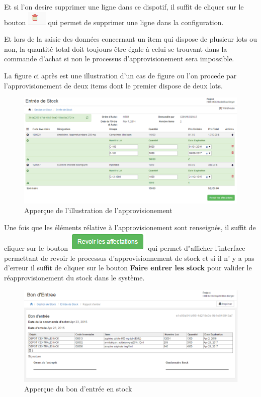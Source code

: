 \documentclass[12pt,a4paper]{report}
\begin{document}
Et si l'on desire supprimer une ligne dans ce dispotif, il suffit de cliquer sur le bouton \includegraphics[scale=0.7]{pic/DeleteWRed.png} qui permet de supprimer une ligne dans la configuration.

Et lors de la saisie des données concernant un item qui dispose de plusieur lots ou non, la quantité total doit toujours être égale à celui se trouvant dans la commande d'achat si non le processus d'approvisionement sera impossible.

La figure ci après est une illustration d'un cas de figure ou l'on procede par l'approvisionement de deux items dont le premier dispose de deux lots.

\begin{figure}[h]
\begin{center}
\includegraphics[width=12cm]{pic/AppStockOK.png}
\end{center}
\caption{Apperçue de l'illustration de l'approvisionement}
\label{Apperçue de l'illustration de l'approvisionement}
\end{figure}

Une fois que les éléments rélative à l'approvisionement sont renseignés, il suffit de cliquer sur le bouton \includegraphics[scale=0.7]{pic/RevAffectation.png} qui permet d"afficher l'interface permettant de revoir le processus d'approvisionnement de stock et si il n' y a pas d'erreur il suffit de cliquer sur le bouton \textbf{Faire entrer les stock} pour valider le réapprovisionement du stock dans le système.

\begin{figure}[h]
\begin{center}
\includegraphics[width=12cm]{pic/EntreStockEnter.png}
\end{center}
\caption{Apperçue du bon d'entrée en stock}
\label{Apperçue du bon d'entrée en stock}
\end{figure}
\end{document}
